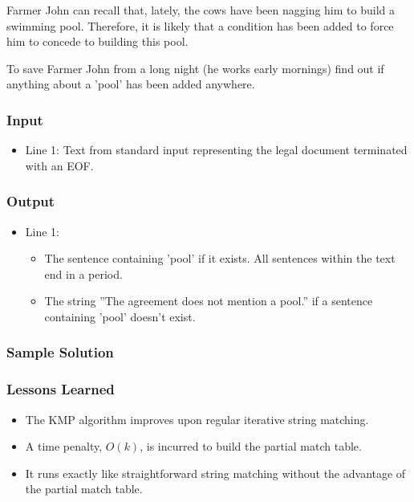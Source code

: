 Farmer John can recall that, lately, the cows have been nagging him to build a swimming pool.
Therefore, it is likely that a condition has been added to force him to concede to building this pool.

To save Farmer John from a long night (he works early mornings) find out if anything about a 'pool' has been added anywhere.

\subsubsection{Input}
\begin{itemize}
	\item Line 1: Text from standard input representing the legal document terminated with an EOF.
\end{itemize}


\subsubsection{Output}
\begin{itemize}
	\item Line 1:
	\begin{itemize}
		\item The sentence containing 'pool' if it exists. All sentences within the text end in a period.
		\item The string ''The agreement does not mention a pool.'' if a sentence containing 'pool' doesn't exist.
	\end{itemize}
\end{itemize}


\subsubsection{Sample Solution}


\subsubsection{Lessons Learned}
\begin{itemize}
	\item The KMP algorithm improves upon regular iterative string matching.
	\item A time penalty, $O(k)$, is incurred to build the partial match table.
	\item It runs exactly like straightforward string matching without the advantage of the partial match table.
\end{itemize}

